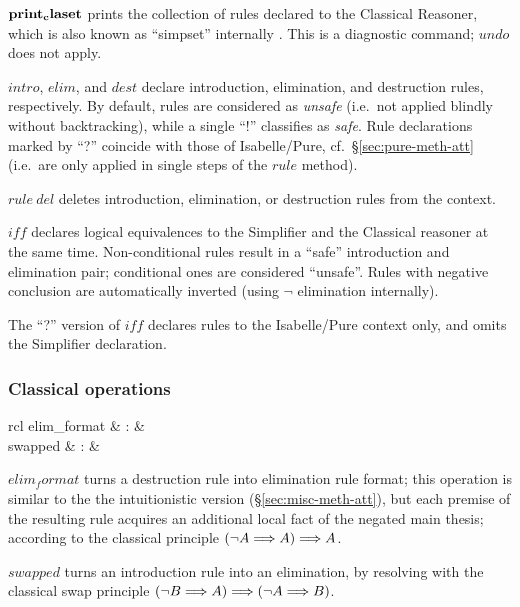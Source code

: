 \begin{descr}

\item [${\mathord{\mathbf{print_claset}}}$] prints the collection of rules declared to
  the Classical Reasoner, which is also known as ``simpset'' internally
  \cite{isabelle-ref}.  This is a diagnostic command; $undo$ does not apply.

\item [$intro$, $elim$, and $dest$] declare introduction, elimination, and
  destruction rules, respectively.  By default, rules are considered as
  \emph{unsafe} (i.e.\ not applied blindly without backtracking), while a
  single ``!'' classifies as \emph{safe}.  Rule declarations marked by ``?''
  coincide with those of Isabelle/Pure, cf.\ \S\ref{sec:pure-meth-att} (i.e.\
  are only applied in single steps of the $rule$ method).

\item [$rule~del$] deletes introduction, elimination, or destruction rules from
  the context.

\item [$iff$] declares logical equivalences to the Simplifier and the
  Classical reasoner at the same time.  Non-conditional rules result in a
  ``safe'' introduction and elimination pair; conditional ones are considered
  ``unsafe''.  Rules with negative conclusion are automatically inverted
  (using $\neg$ elimination internally).

  The ``?'' version of $iff$ declares rules to the Isabelle/Pure context only,
  and omits the Simplifier declaration.

\end{descr}


\subsubsection{Classical operations}


\begin{matharray}{rcl}
  elim_format & : & \isaratt \\
  swapped & : & \isaratt \\
\end{matharray}

\begin{descr}

\item [$elim_format$] turns a destruction rule into elimination rule format;
  this operation is similar to the the intuitionistic version
  (\S\ref{sec:misc-meth-att}), but each premise of the resulting rule acquires
  an additional local fact of the negated main thesis; according to the
  classical principle $(\neg A \Longrightarrow A) \Longrightarrow A$.

\item [$swapped$] turns an introduction rule into an elimination, by resolving
  with the classical swap principle $(\neg B \Longrightarrow A) \Longrightarrow (\neg A \Longrightarrow B)$.

\end{descr}


